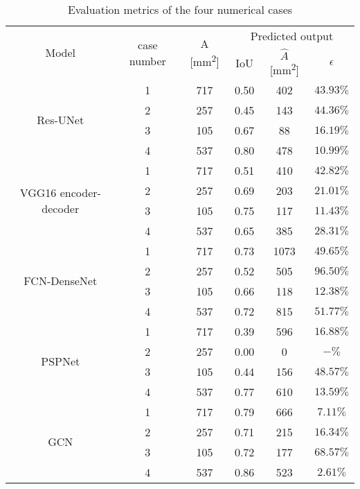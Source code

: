 \begin{table}[ht!]
	\centering
	\caption{Evaluation metrics of the four numerical cases}
	\begin{tabular}{cccccc}
		\toprule
		\multirow{2}{*}{Model} & \multirow{2}{*}{case number} & \multicolumn{1}{c}{\multirow{2}{*}{A [mm\textsuperscript{2}]}} & \multicolumn{3}{c}{Predicted output} \\ 
		\cmidrule(lr){4-6} & & & \multicolumn{1}{c}{IoU} & \multicolumn{1}{c}{\(\hat{A}\) [mm\textsuperscript{2}]} & \(\epsilon\) \\
		\midrule
		\multirow{4}{*}{Res-UNet} 
		& 1 & 717 & \multicolumn{1}{c}{0.50} & \multicolumn{1}{c}{402} & \(43.93\%\) \\ 
		& 2 & 257 & \multicolumn{1}{c}{0.45} & \multicolumn{1}{c}{143} & \(44.36\%\) \\ 
		& 3 & 105 & \multicolumn{1}{c}{0.67} & \multicolumn{1}{c}{88} & \(16.19\%\) \\ 
		& 4 & 537 & \multicolumn{1}{c}{0.80} & \multicolumn{1}{c}{478} & \(10.99\%\) \\ 
		\midrule
		\multirow{4}{*}{VGG16 encoder-decoder} 
		& 1 & 717 & \multicolumn{1}{c}{0.51} & \multicolumn{1}{c}{410} & \(42.82\%\) \\ 
		& 2 & 257 & \multicolumn{1}{c}{0.69} & \multicolumn{1}{c}{203} & \(21.01\%\) \\ 
		& 3 & 105 & \multicolumn{1}{c}{0.75} & \multicolumn{1}{c}{117} & \(11.43\%\) \\ 
		& 4 & 537 & \multicolumn{1}{c}{0.65} & \multicolumn{1}{c}{385} & \(28.31\%\) \\ 
		\midrule
		\multirow{4}{*}{FCN-DenseNet} 
		& 1 & 717 & \multicolumn{1}{c}{0.73} & \multicolumn{1}{c}{1073} & \(49.65\%\) \\ 
		& 2 & 257 & \multicolumn{1}{c}{0.52} & \multicolumn{1}{c}{505} & \(96.50\%\) \\ 
		& 3 & 105 & \multicolumn{1}{c}{0.66} & \multicolumn{1}{c}{118} & \(12.38\%\) \\ 
		& 4 & 537 & \multicolumn{1}{c}{0.72} & \multicolumn{1}{c}{815} & \(51.77\%\) \\ 
		\midrule
		\multirow{4}{*}{PSPNet} 
		& 1 & 717 & \multicolumn{1}{c}{0.39} & \multicolumn{1}{c}{596} & \(16.88\%\) \\ 
		& 2 & 257 & \multicolumn{1}{c}{0.00} & \multicolumn{1}{c}{0} & \(-\%\) \\ 
		& 3 & 105 & \multicolumn{1}{c}{0.44} & \multicolumn{1}{c}{156} & \(48.57\%\) \\ 
		& 4 & 537 & \multicolumn{1}{c}{0.77} & \multicolumn{1}{c}{610} & \(13.59\%\) \\ 
		\midrule
		\multirow{4}{*}{GCN} 
		& 1 & 717 & \multicolumn{1}{c}{0.79} & \multicolumn{1}{c}{666} & \(7.11\%\) \\ 
		& 2 & 257 & \multicolumn{1}{c}{0.71} & \multicolumn{1}{c}{215} & \(16.34\%\) \\ 
		& 3 & 105 & \multicolumn{1}{c}{0.72} & \multicolumn{1}{c}{177} & \(68.57\%\) \\ 
		& 4 & 537 & \multicolumn{1}{c}{0.86} & \multicolumn{1}{c}{523} & \(2.61\%\) \\ 
		\bottomrule
	\end{tabular}	
	\label{tab:RMS_num_cases}
\end{table}
